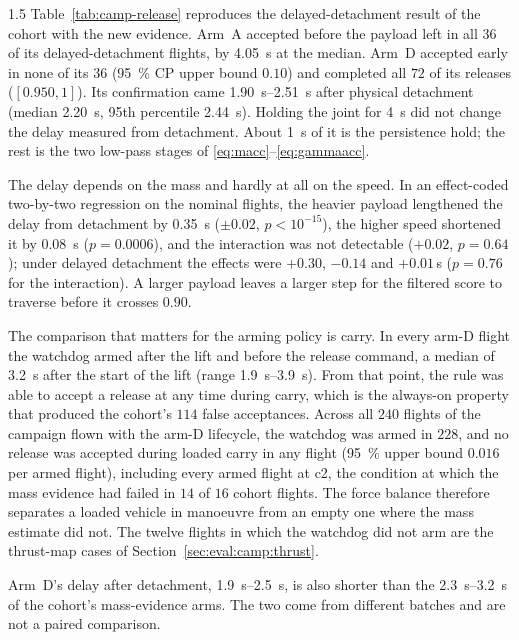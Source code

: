 \begin{spacing}{1.5}
Table~\ref{tab:camp-release} reproduces the delayed-detachment result of the
cohort with the new evidence. Arm~A accepted before the payload left in all
$36$ of its delayed-detachment flights, by \SI{4.05}{\second} at the median.
Arm~D accepted early in none of its $36$ (\SI{95}{\percent} CP upper bound
$0.10$) and completed all $72$ of its releases ($[0.950, 1]$). Its confirmation
came \SIrange{1.90}{2.51}{\second} after physical detachment (median
\SI{2.20}{\second}, 95th percentile \SI{2.44}{\second}). Holding the joint for
\SI{4}{\second} did not change the delay measured from detachment. About
\SI{1}{\second} of it is the persistence hold; the rest is the two low-pass
stages of \eqref{eq:macc}--\eqref{eq:gammaacc}.

The delay depends on the mass and hardly at all on the speed. In an
effect-coded two-by-two regression on the nominal flights, the heavier payload
lengthened the delay from detachment by \SI{0.35}{\second} ($\pm0.02$,
$p<10^{-15}$), the higher speed shortened it by \SI{0.08}{\second}
($p=0.0006$), and the interaction was not detectable ($+0.02$, $p=0.64$); under
delayed detachment the effects were $+0.30$, $-0.14$ and $+0.01$\,s ($p=0.76$
for the interaction). A larger payload leaves a larger step for the filtered
score to traverse before it crosses $0.90$.

The comparison that matters for the arming policy is carry. In every arm-D
flight the watchdog armed after the lift and before the release command, a
median of \SI{3.2}{\second} after the start of the lift (range
\SIrange{1.9}{3.9}{\second}). From that point, the rule was able to accept a
release at any time during carry, which is the always-on property that produced
the cohort's $114$ false acceptances. Across all $240$ flights of the campaign
flown with the arm-D lifecycle, the watchdog was armed in $228$, and no release
was accepted during loaded carry in any flight (\SI{95}{\percent} upper bound
$0.016$ per armed flight), including every armed flight at c2, the condition
at which the mass evidence had failed in $14$ of $16$ cohort flights. The force balance
therefore separates a loaded vehicle in manoeuvre from an empty one where the
mass estimate did not. The twelve flights in which the watchdog did not arm are
the thrust-map cases of Section~\ref{sec:eval:camp:thrust}.

Arm~D's delay after detachment, \SIrange{1.9}{2.5}{\second}, is also shorter
than the \SIrange{2.3}{3.2}{\second} of the cohort's mass-evidence arms. The two
come from different batches and are not a paired comparison.


\end{spacing}
